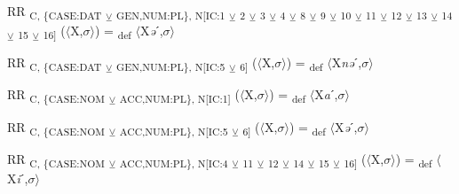 {\begin{exe}
 RR \textsubscript{C, \{CASE:DAT} \textsubscript{${\veebar}$}\textsubscript{ GEN,NUM:PL\}, N[IC:1} \textsubscript{${\veebar}$}\textsubscript{ 2} \textsubscript{${\veebar}$}\textsubscript{ 3} \textsubscript{${\veebar}$}\textsubscript{ 4} \textsubscript{${\veebar}$}\textsubscript{ 8} \textsubscript{${\veebar}$}\textsubscript{ 9} \textsubscript{${\veebar}$}\textsubscript{ 10} \textsubscript{${\veebar}$}\textsubscript{ 11} \textsubscript{${\veebar}$}\textsubscript{ 12} \textsubscript{${\veebar}$}\textsubscript{ 13} \textsubscript{${\veebar}$}\textsubscript{ 14} \textsubscript{${\veebar}$}\textsubscript{ 15} \textsubscript{${\veebar}$}\textsubscript{ 16]} ($\langle$X,$\sigma $$\rangle$) = \textsubscript{def} $\langle$X\textit{ə}ˊ,$\sigma $$\rangle$
\end{exe}

\begin{exe}
 RR \textsubscript{C, \{CASE:DAT} \textsubscript{${\veebar}$}\textsubscript{ GEN,NUM:PL\}, N[IC:5} \textsubscript{${\veebar}$}\textsubscript{ 6]} ($\langle$X,$\sigma $$\rangle$) = \textsubscript{def} $\langle$X\textit{nə}ˊ,$\sigma $$\rangle$
\end{exe}

\begin{exe}
 RR \textsubscript{C, \{CASE:NOM} \textsubscript{${\veebar}$}\textsubscript{ ACC,NUM:PL\}, N[IC:1]} ($\langle$X,$\sigma $$\rangle$) = \textsubscript{def} $\langle$X\textit{a}ˊ,$\sigma $$\rangle$
\end{exe}

\begin{exe}
 RR \textsubscript{C, \{CASE:NOM} \textsubscript{${\veebar}$}\textsubscript{ ACC,NUM:PL\}, N[IC:5} \textsubscript{${\veebar}$}\textsubscript{ 6]} ($\langle$X,$\sigma $$\rangle$) = \textsubscript{def} $\langle$X\textit{ə}ˊ,$\sigma $$\rangle$
\end{exe}

\begin{exe}
 RR \textsubscript{C, \{CASE:NOM} \textsubscript{${\veebar}$}\textsubscript{ ACC,NUM:PL\}, N[IC:4} \textsubscript{${\veebar}$}\textsubscript{ 11} \textsubscript{${\veebar}$}\textsubscript{ 12} \textsubscript{${\veebar}$}\textsubscript{ 14} \textsubscript{${\veebar}$}\textsubscript{ 15} \textsubscript{${\veebar}$}\textsubscript{ 16]} ($\langle$X,$\sigma $$\rangle$) = \textsubscript{def} $\langle$X\textit{i}ˊ,$\sigma $$\rangle$
\end{exe}

}
